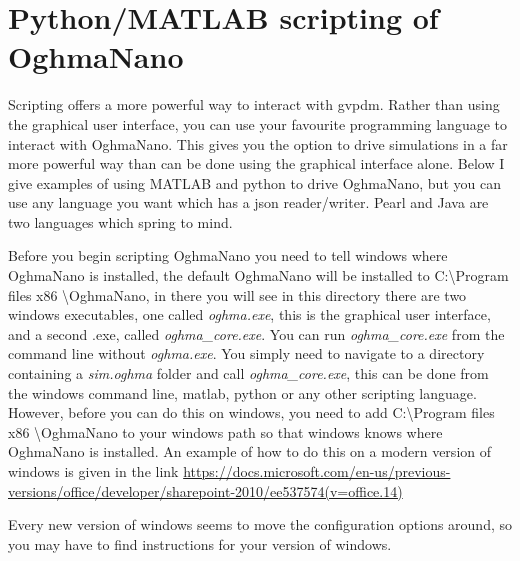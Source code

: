 \pagebreak
\section{Python/MATLAB scripting of OghmaNano}
Scripting offers a more powerful way to interact with gvpdm. Rather than using the graphical user interface, you can use your favourite programming language to interact with OghmaNano.  This gives you the option to drive simulations in a far more powerful way than can be done using the graphical interface alone.  Below I give examples of using MATLAB and python to drive OghmaNano, but you can use any language you want which has a json reader/writer.  Pearl and Java are two languages which spring to mind.

Before you begin scripting OghmaNano you need to tell windows where OghmaNano is installed, the default OghmaNano will be installed to C:\textbackslash Program files x86 \textbackslash OghmaNano, in there you will see in this directory there are two windows executables, one called \emph{oghma.exe}, this is the graphical user interface, and a second .exe, called \emph{oghma\_core.exe}.  You can run \emph{oghma\_core.exe} from the command line without \emph{oghma.exe}. You simply need to navigate to a directory containing a \emph{sim.oghma} folder and call \emph{oghma\_core.exe}, this can be done from the windows command line, matlab, python or any other scripting language.
However, before you can do this on windows, you need to add C:\textbackslash Program files x86 \textbackslash OghmaNano to your windows path so that windows knows where OghmaNano is installed.  An example of how to do this on a modern version of windows is given in the link
\url{https://docs.microsoft.com/en-us/previous-versions/office/developer/sharepoint-2010/ee537574(v=office.14)}

Every new version of windows seems to move the configuration options around, so you may have to find instructions for your version of windows.
